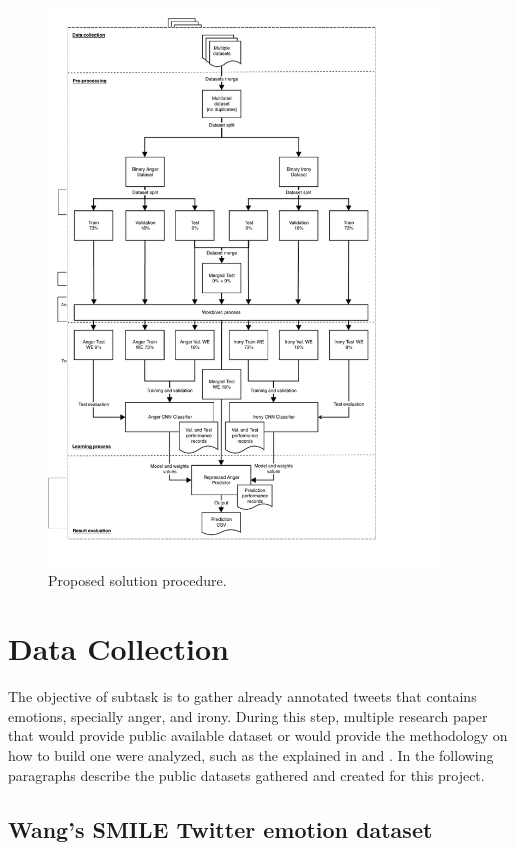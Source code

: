 \begin{figure}[!htp]
  \center
  \includegraphics[width=0.93\textwidth]{figures/flow}
  \caption{Proposed solution procedure.}
  \label{fig:solution_procedure}
\end{figure}

\section{Data Collection}

The objective of subtask is to gather already annotated tweets that contains emotions, specially anger, and irony. During this step, multiple research paper that would provide public available dataset or would provide the methodology on how to build one were analyzed, such as the explained in \cite{hasan2014emotex} and \cite{sulis2016figurative}. In the following paragraphs describe the public datasets gathered and created for this project.

\subsection{Wang's SMILE Twitter emotion dataset}

